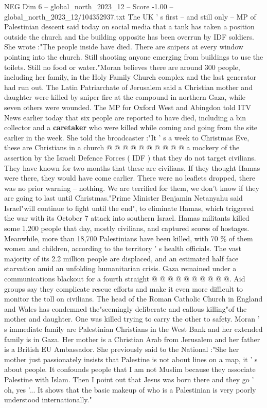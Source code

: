 \begin{textsample}{NEG Dim 6 – global\_north\_2023\_12 – Score -1.00 – global\_north\_2023\_12/104352937.txt}  \label{ex:f6_neg_319}
The UK ' s first -- and still only -- MP of Palestinian descent said today on social media that a tank has taken a position outside the church and the building opposite has been overrun by IDF soldiers.
She wrote :"The people inside have died.
There are snipers at every window pointing into the church.
Still shooting anyone emerging from buildings to use the toilets.
Still no food or water."Moran believes there are around 300 people, including her family, in the Holy Family Church complex and the last generator had run out.
The Latin Patriarchate of Jerusalem said a Christian mother and daughter were killed by sniper fire at the compound in northern Gaza, while seven others were wounded.
The MP for Oxford West and Abingdon told ITV News earlier today that six people are reported to have died, including a bin collector and a \textbf{caretaker} who were killed while coming and going from the site earlier in the week.
She told the broadcaster :"It ' s a week to Christmas Eve, these are Christians in a church @ @ @ @ @ @ @ @ @ @ a mockery of the assertion by the Israeli Defence Forces ( IDF ) that they do not target civilians.
They have known for two months that these are civilians.
If they thought Hamas were there, they would have come earlier.
There were no leaflets dropped, there was no prior warning -- nothing.
We are terrified for them, we don't know if they are going to last until Christmas."Prime Minister Benjamin Netanyahu said Israel"will continue to fight until the end", to eliminate Hamas, which triggered the war with its October 7 attack into southern Israel.
Hamas militants killed some 1,200 people that day, mostly civilians, and captured scores of hostages.
Meanwhile, more than 18,700 Palestinians have been killed, with 70 \% of them women and children, according to the territory ' s health officials.
The vast majority of its 2.2 million people are displaced, and an estimated half face starvation amid an unfolding humanitarian crisis.
Gaza remained under a communications blackout for a fourth straight @ @ @ @ @ @ @ @ @ @.
Aid groups say they complicate rescue efforts and make it even more difficult to monitor the toll on civilians.
The head of the Roman Catholic Church in England and Wales has condemned the"seemingly deliberate and callous killing"of the mother and daughter.
One was killed trying to carry the other to safety.
Moran ' s immediate family are Palestinian Christians in the West Bank and her extended family is in Gaza.
Her mother is a Christian Arab from Jerusalem and her father is a British EU Ambassador.
She previously said to the National :"She her mother just passionately insists that Palestine is not about lines on a map, it ' s about people.
It confounds people that I am not Muslim because they associate Palestine with Islam.
Then I point out that Jesus was born there and they go ' oh, yes '...
It shows that the basic makeup of who is a Palestinian is very poorly understood internationally."

\end{textsample}
